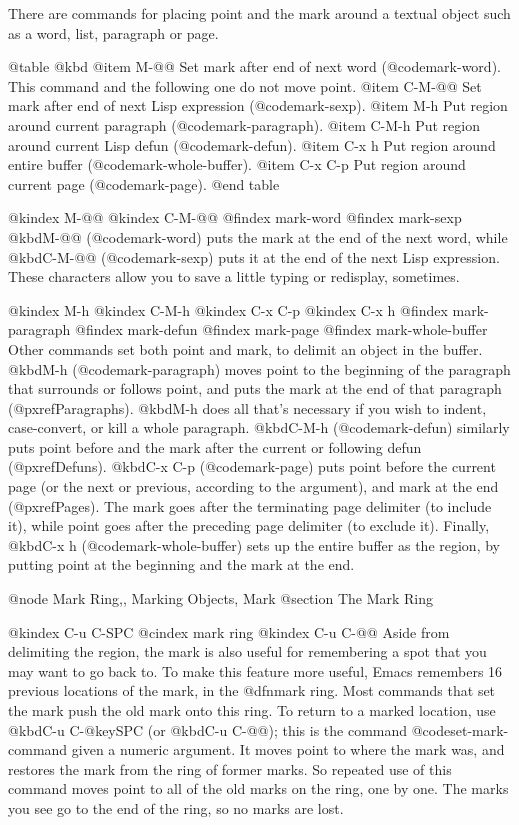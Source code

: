{{{{{{{  There are commands for placing point and the mark around a textual
object such as a word, list, paragraph or page.

@table @kbd
@item M-@@
Set mark after end of next word (@code{mark-word}).  This command and
the following one do not move point.
@item C-M-@@
Set mark after end of next Lisp expression (@code{mark-sexp}).
@item M-h
Put region around current paragraph (@code{mark-paragraph}).
@item C-M-h
Put region around current Lisp defun (@code{mark-defun}).
@item C-x h
Put region around entire buffer (@code{mark-whole-buffer}).
@item C-x C-p
Put region around current page (@code{mark-page}).
@end table

@kindex M-@@
@kindex C-M-@@
@findex mark-word
@findex mark-sexp
@kbd{M-@@} (@code{mark-word}) puts the mark at the end of the next word,
while @kbd{C-M-@@} (@code{mark-sexp}) puts it at the end of the next Lisp
expression.  These characters allow you to save a little typing or
redisplay, sometimes.

@kindex M-h
@kindex C-M-h
@kindex C-x C-p
@kindex C-x h
@findex mark-paragraph
@findex mark-defun
@findex mark-page
@findex mark-whole-buffer
   Other commands set both point and mark, to delimit an object in the
buffer.  @kbd{M-h} (@code{mark-paragraph}) moves point to the beginning of
the paragraph that surrounds or follows point, and puts the mark at the end
of that paragraph (@pxref{Paragraphs}).  @kbd{M-h} does all that's
necessary if you wish to indent, case-convert, or kill a whole paragraph.
@kbd{C-M-h} (@code{mark-defun}) similarly puts point before and the mark
after the current or following defun (@pxref{Defuns}).  @kbd{C-x C-p}
(@code{mark-page}) puts point before the current page (or the next or
previous, according to the argument), and mark at the end (@pxref{Pages}).
The mark goes after the terminating page delimiter (to include it), while
point goes after the preceding page delimiter (to exclude it).  Finally,
@kbd{C-x h} (@code{mark-whole-buffer}) sets up the entire buffer as the
region, by putting point at the beginning and the mark at the end.

@node Mark Ring,, Marking Objects, Mark
@section The Mark Ring

@kindex C-u C-SPC
@cindex mark ring
@kindex C-u C-@@
  Aside from delimiting the region, the mark is also useful for remembering
a spot that you may want to go back to.  To make this feature more useful,
Emacs remembers 16 previous locations of the mark, in the @dfn{mark ring}.
Most commands that set the mark push the old mark onto this ring.  To
return to a marked location, use @kbd{C-u C-@key{SPC}} (or @kbd{C-u C-@@}); this is
the command @code{set-mark-command} given a numeric argument.  It moves
point to where the mark was, and restores the mark from the ring of former
marks.  So repeated use of this command moves point to all of the old marks
on the ring, one by one.  The marks you see go to the end of the ring,
so no marks are lost.

}}}}}}}
